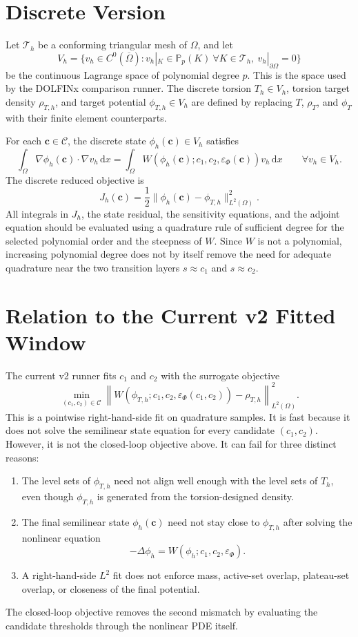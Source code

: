\documentclass[11pt]{article}
\newcommand{\dd}{\,\mathrm d}
\newcommand{\OmegaD}{\Omega}
\newcommand{\W}{W}
\newcommand{\cvec}{\bm c}
\newcommand{\phit}{\phi_T}
\newcommand{\rhot}{\rho_T}
\newcommand{\epsp}{\varepsilon_\Phi}
\begin{document}
\section{Discrete Version}

Let \(\mathcal T_h\) be a conforming triangular mesh of \(\OmegaD\), and let
\[
  V_h
  =
  \{v_h\in C^0(\overline\OmegaD):
    v_h|_K\in\mathbb P_p(K)\ \forall K\in\mathcal T_h,\
    v_h|_{\partial\OmegaD}=0\}
\]
be the continuous Lagrange space of polynomial degree \(p\).  This is the
space used by the DOLFINx comparison runner.  The discrete torsion
\(T_h\in V_h\), torsion target density \(\rho_{T,h}\), and target potential
\(\phi_{T,h}\in V_h\) are defined by replacing \(T\), \(\rhot\), and \(\phit\)
with their finite element counterparts.

For each \(\cvec\in\mathcal C\), the discrete state
\(\phi_h(\cvec)\in V_h\) satisfies
\[
  \int_{\OmegaD}\nabla\phi_h(\cvec)\cdot\nabla v_h\dd x
  =
  \int_{\OmegaD}
    \W(\phi_h(\cvec);c_1,c_2,\epsp(\cvec))v_h
  \dd x
  \qquad
  \forall v_h\in V_h.
\]
The discrete reduced objective is
\[
  J_h(\cvec)
  =
  \frac{1}{2}
  \|\phi_h(\cvec)-\phi_{T,h}\|_{L^2(\OmegaD)}^2.
\]
All integrals in \(J_h\), the state residual, the sensitivity equations, and
the adjoint equation should be evaluated using a quadrature rule of sufficient
degree for the selected polynomial order and the steepness of
\(\W\).  Since \(\W\) is not a polynomial, increasing polynomial degree does
not by itself remove the need for adequate quadrature near the two transition
layers \(s\approx c_1\) and \(s\approx c_2\).

\section{Relation to the Current v2 Fitted Window}

The current v2 runner fits \(c_1\) and \(c_2\) with the surrogate objective
\[
  \min_{(c_1,c_2)\in\mathcal C}
  \left\|
    \W(\phi_{T,h};c_1,c_2,\epsp(c_1,c_2))
    -
    \rho_{T,h}
  \right\|_{L^2(\OmegaD)}^2.
\]
This is a pointwise right-hand-side fit on quadrature samples.  It is fast
because it does not solve the semilinear state equation for every candidate
\((c_1,c_2)\).  However, it is not the closed-loop objective above.  It can
fail for three distinct reasons:
\begin{enumerate}[label=(\roman*)]
  \item The level sets of \(\phi_{T,h}\) need not align well enough with the
  level sets of \(T_h\), even though \(\phi_{T,h}\) is generated from the
  torsion-designed density.
  \item The final semilinear state \(\phi_h(\cvec)\) need not stay close to
  \(\phi_{T,h}\) after solving the nonlinear equation
  \[
    -\Delta\phi_h=\W(\phi_h;c_1,c_2,\epsp).
  \]
  \item A right-hand-side \(L^2\) fit does not enforce mass, active-set
  overlap, plateau-set overlap, or closeness of the final potential.
\end{enumerate}
The closed-loop objective removes the second mismatch by evaluating the
candidate thresholds through the nonlinear PDE itself.
\end{document}
